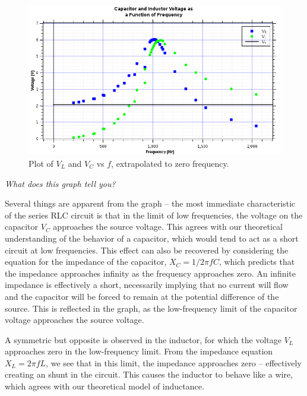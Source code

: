 \documentclass[twocolumn,english]{IEEEtran}
\theoremstyle{plain}
\theoremstyle{plain}
\begin{document}
\begin{figure}[h!]
	\begin{centering}
	\begin{center}
	\includegraphics[width=\linewidth]{./Part6.png}
	\caption{Plot of $V_L$ and $V_C$ vs $f$, extrapolated to zero frequency.}
	\label{fig:VvsFreq}
	\end{center}
	\par\end{centering}
\end{figure}

\textit{What does this graph tell you?}

Several things are apparent from the graph -- the most immediate characteristic of the series RLC circuit is that in the limit of low frequencies, the voltage on the capacitor $V_C$ approaches the source voltage. This agrees with our theoretical understanding of the behavior of a capacitor, which would tend to act as a short circuit at low frequencies. This effect can also be recovered by considering the equation for the impedance of the capacitor, $X_C = 1/2\pi f C$, which predicts that the impedance approaches infinity as the frequency approaches zero. An infinite impedance is effectively a short, necessarily implying that no current will flow and the capacitor will be forced to remain at the potential difference of the source. This is reflected in the graph, as the low-frequency limit of the capacitor voltage approaches the source voltage.

A symmetric but opposite is observed in the inductor, for which the voltage $V_L$ approaches zero in the low-frequency limit. From the impedance equation $X_L = 2\pi f L$, we see that in this limit, the impedance approaches zero -- effectively creating an shunt in the circuit. This causes the inductor to behave like a wire, which agrees with our theoretical model of inductance.
\end{document}
